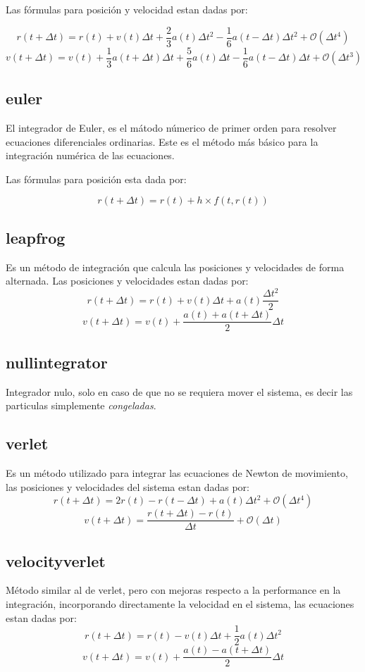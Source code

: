 Las f\'ormulas para posici\'on y velocidad estan dadas por:

$$r(t+\Delta t) = r(t) + v(t)\Delta t + \frac{2}{3}a(t)\Delta t^2 - \frac{1}{6}a(t-\Delta t)\Delta t^2 +\mathcal{O}(\Delta t^4)$$
$$v(t+\Delta t) = v(t) + \frac{1}{3}a(t+\Delta t)\Delta t+\frac{5}{6}a(t)\Delta t-\frac{1}{6}a(t-\Delta t)\Delta t+\mathcal{O}(\Delta t^3)$$

\subsection{euler}
El integrador de Euler, es el m\'atodo n\'umerico de primer orden para resolver ecuaciones diferenciales ordinarias. Este es el m\'etodo m\'as b\'asico para la integraci\'on num\'erica de las ecuaciones.

Las f\'ormulas para posici\'on esta dada por:

$$r(t+\Delta t) = r(t) + h\times f(t,r(t))$$

\subsection{leapfrog}
Es un m\'etodo de integraci\'on que calcula las posiciones y velocidades de forma alternada. Las posiciones y velocidades estan dadas por:
$$r(t+\Delta t) = r(t) + v(t)\Delta t + a(t)\frac{\Delta t^2}{2}$$
$$v(t+\Delta t) = v(t) + \frac{a(t)+a(t+\Delta t)}{2}\Delta t$$
\subsection{nullintegrator}
Integrador nulo, solo en caso de que no se requiera mover el sistema, es decir las particulas simplemente \textit{congeladas}.
\subsection{verlet}
Es un m\'etodo utilizado para integrar las ecuaciones de Newton de movimiento, las posiciones y velocidades del sistema estan dadas por:
$$r(t+\Delta t) = 2r(t) - r(t-\Delta t) + a(t)\Delta t^2 + \mathcal{O}(\Delta t^4)$$
$$v(t+\Delta t) = \frac{r(t+\Delta t) - r(t)}{\Delta t} + \mathcal{O}(\Delta t)$$
\subsection{velocityverlet}
M\'etodo similar al de verlet, pero con mejoras respecto a la performance en la integraci\'on, incorporando directamente la velocidad en el sistema, las ecuaciones estan dadas por:
$$r(t+\Delta t) = r(t) - v(t)\Delta t + \frac{1}{2}a(t)\Delta t^2$$
$$v(t+\Delta t) = v(t) + \frac{a(t) - a(t + \Delta t)}{2}\Delta t$$
